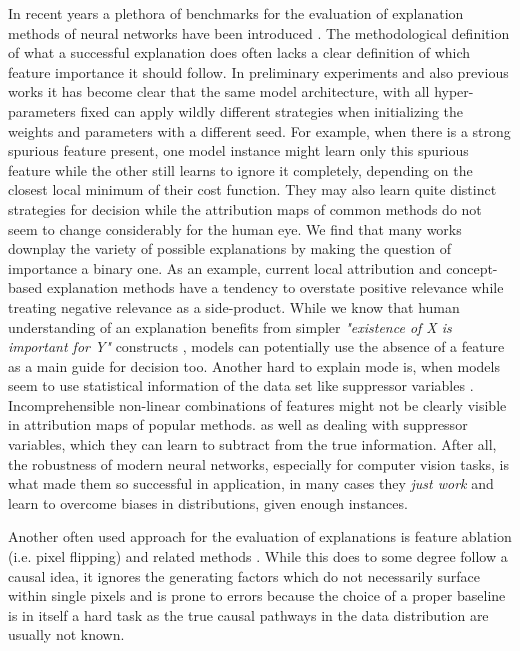 {In recent years a plethora of benchmarks for the evaluation of explanation methods of neural networks have been introduced .
The methodological definition of what a successful explanation does often lacks a clear definition of which feature importance it should follow. 
In preliminary experiments and also previous works it has become clear that the same model architecture, with all hyper-parameters fixed can apply wildly different strategies when initializing the weights and parameters with a different seed. For example, when there is a strong spurious feature present, one model instance might learn only this spurious feature while the other still learns to ignore it completely, depending on the closest local minimum of their cost function. They may also learn quite distinct strategies for decision while the attribution maps of common methods do not seem to change considerably for the human eye. We find that many works downplay the variety of possible explanations by making the question of importance a binary one. 
As an example, current local attribution and concept-based explanation methods have a tendency to overstate positive relevance while treating negative relevance as a side-product. While we know that human understanding of an explanation benefits from simpler \textit{"existence of X is important for Y"} constructs , models can potentially use the absence of a feature as a main guide for decision too.
Another hard to explain mode is, when models seem to use statistical information of the data set like suppressor variables . Incomprehensible non-linear combinations of features might not be clearly visible in attribution maps of popular methods.
as well as dealing with suppressor variables, which they can learn to subtract from the true information. After all, the robustness of modern neural networks, especially for computer vision tasks, is what made them so successful in application, in many cases they \textit{just work} and learn to overcome biases in distributions, given enough instances. 


Another often used approach for the evaluation of explanations is feature ablation (i.e. pixel flipping) and related methods \cite{Samek2017a} . While this does to some degree follow a causal idea, it ignores the generating factors which do not necessarily surface within single pixels and is prone to errors because the choice of a proper baseline is in itself a hard task as the true causal pathways in the data distribution are usually not known. 


}

